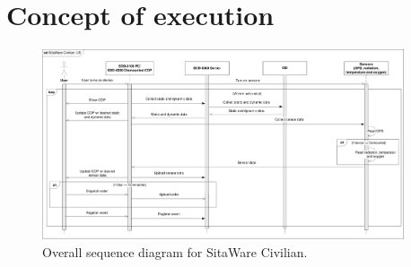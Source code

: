 \section{Concept of execution}

\begin{figure}[H]
\centering
\includegraphics[width=0.95\textwidth]
{billeder/sekvens1.pdf}
\caption{Overall sequence diagram for SitaWare Civilian.}
\label{fig:sekvens1}
\end{figure}